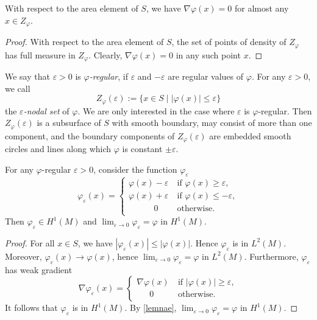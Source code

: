 \begin{lem}\label{lemnae}
With respect to the area element of $S$,
we have $\nabla{\varphi}(x)=0$ for almost any $x\in Z_{\varphi}$.
\end{lem}

\begin{proof}
With respect to the area element of $S$,
the set of points of density of $Z_{\varphi}$ has full measure in $Z_{\varphi}$.
Clearly, $\nabla{\varphi}(x)=0$ in any such point $x$.
\end{proof}

We say that ${\varepsilon}>0$ is \emph{${\varphi}$-regular},
if ${\varepsilon}$ and $-{\varepsilon}$ are regular values of ${\varphi}$.
For any ${\varepsilon}>0$, we call
\begin{equation}\label{defzef}
  Z_{\varphi}({\varepsilon}) := \{x \in S\mid |{\varphi}(x)| \leq {\varepsilon} \}
\end{equation}
the \emph{${\varepsilon}$-nodal set} of ${\varphi}$.
We are only interested in the case where ${\varepsilon}$ is ${\varphi}$-regular.
Then ${Z_{\varphi}}({\varepsilon})$ is a subsurface of $S$ with smooth boundary,
may consist of more than one component,
and the boundary components of ${Z_{\varphi}}({\varepsilon})$ are embedded smooth circles
and lines along which ${\varphi}$ is constant $\pm{\varepsilon}$.

\begin{lem}\label{lemfe}
For any ${\varphi}$-regular ${\varepsilon}>0$, consider the function ${\varphi}_{\varepsilon}$
\begin{equation*}
  {\varphi}_{\varepsilon}(x) = \begin{cases}
  {\varphi}(x)-{\varepsilon} \:&\text{if ${\varphi}(x)\ge{\varepsilon}$}, \\
  {\varphi}(x)+{\varepsilon} &\text{if ${\varphi}(x)\le-{\varepsilon}$}, \\
    \phantom{{\varphi}(x)} 0 &\text{otherwise}.
 \end{cases}
\end{equation*}
Then ${\varphi}_{\varepsilon}\in H^1(M)$ and $\lim_{{\varepsilon}\rightarrow0}{\varphi}_{\varepsilon}={\varphi}$ in $H^1(M)$.
\end{lem}

\begin{proof}
For all $x\in S$, we have $|{\varphi}_{\varepsilon}(x)|\le|{\varphi}(x)|$.
Hence ${\varphi}_{\varepsilon}$ is in $L^2(M)$. Moreover, ${\varphi}_{\varepsilon}(x)\rightarrow{\varphi}(x)$,
hence $\lim_{{\varepsilon}\rightarrow0}{\varphi}_{\varepsilon}={\varphi}$ in $L^2(M)$.
Furthermore, ${\varphi}_{\varepsilon}$ has weak gradient
\begin{equation}\label{weakder}
  \nabla{\varphi}_{\varepsilon}(x) = \begin{cases}
  \nabla{\varphi}(x) \:&\text{if $|{\varphi}(x)|\ge{\varepsilon}$}, \\
  \phantom{\nabla{\varphi}} 0 &\text{otherwise}.
 \end{cases}
\end{equation}
It follows that ${\varphi}_{\varepsilon}$ is in $H^1(M)$.
By \cref{lemnae},
$\lim_{{\varepsilon}\rightarrow0}{\varphi}_{\varepsilon}={\varphi}$ in $H^1(M)$.
\end{proof}

